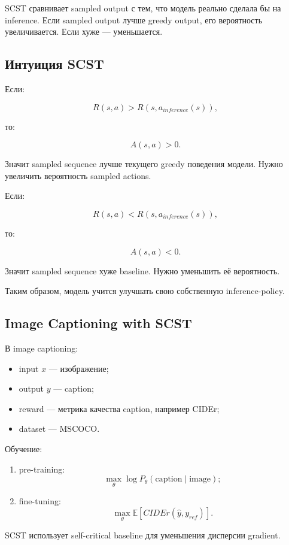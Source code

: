 \documentclass[a4paper,12pt]{article}
\begin{document}
SCST сравнивает sampled output с тем, что модель реально сделала бы на inference. Если sampled output лучше greedy output, его вероятность увеличивается. Если хуже --- уменьшается.

\subsection{Интуиция SCST}

Если:

\[
R(s,a) > R(s,a_{inference}(s)),
\]

то:

\[
A(s,a)>0.
\]

Значит sampled sequence лучше текущего greedy поведения модели. Нужно увеличить вероятность sampled actions.

Если:

\[
R(s,a) < R(s,a_{inference}(s)),
\]

то:

\[
A(s,a)<0.
\]

Значит sampled sequence хуже baseline. Нужно уменьшить её вероятность.

Таким образом, модель учится улучшать свою собственную inference-policy.

\subsection{Image Captioning with SCST}

В image captioning:

\begin{itemize}
    \item input \(x\) --- изображение;
    \item output \(y\) --- caption;
    \item reward --- метрика качества caption, например CIDEr;
    \item dataset --- MSCOCO.
\end{itemize}

Обучение:

\begin{enumerate}
    \item pre-training:
    \[
    \max_\theta \log P_\theta(\text{caption}\mid \text{image});
    \]

    \item fine-tuning:
    \[
    \max_\theta \mathbb{E}[CIDEr(\hat{y}, y_{ref})].
    \]
\end{enumerate}

SCST использует self-critical baseline для уменьшения дисперсии gradient.
\end{document}
